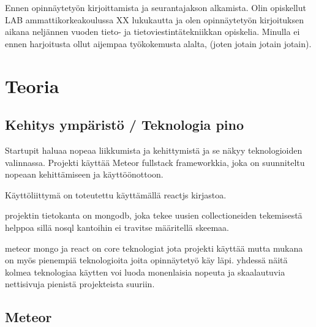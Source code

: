 \documentclass[11pt,a4paper,titlepage,oneside]{article}
\begin{document}
Ennen opinnäytetyön kirjoittamista ja seurantajakson alkamista. 
Olin opiskellut LAB ammattikorkeakoulussa XX lukukautta ja olen opinnäytetyön kirjoituksen aikana neljännen vuoden tieto- ja tietoviestintätekniikkan opiskelia.
%
Minulla ei ennen harjoitusta ollut aijempaa työkokemusta alalta, (joten jotain jotain jotain).
\medskip







\newpage
\section{Teoria}                %



\subsection{Kehitys ympäristö / Teknologia pino}


Startupit haluaa nopeaa liikkumista ja kehittymistä ja se näkyy teknologioiden valinnassa.
Projekti käyttää Meteor fullstack frameworkkia, joka on suunniteltu nopeaan kehittämiseen ja käyttöönottoon.
\medskip

Käyttöliittymä on toteutettu käyttämällä reactjs kirjastoa.
\medskip

projektin tietokanta on mongodb, joka tekee uusien collectioneiden tekemisestä helppoa sillä nosql kantoihin ei travitse määritellä skeemaa.
\medskip

meteor mongo ja react on core teknologiat jota projekti käyttää mutta mukana on myös pienempiä teknologioita joita opinnäytetyö käy läpi.
yhdessä näitä kolmea teknologiaa käytten voi luoda monenlaisia nopeuta ja skaalautuvia nettisivuja pienistä projekteista suuriin.
\medskip









\newpage
\subsection{Meteor}                %
\end{document}
